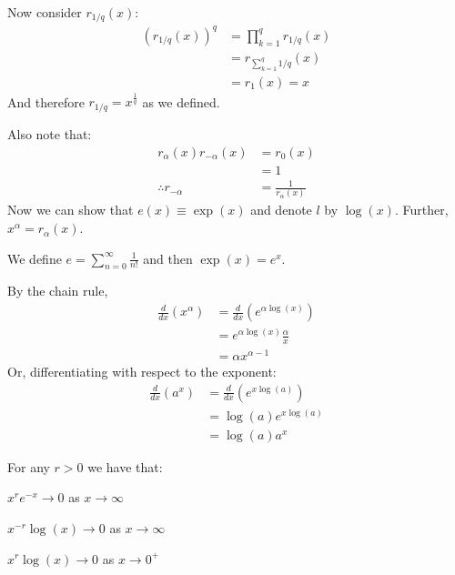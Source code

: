 \documentclass[../Main.tex]{subfiles}
\begin{document}
Now consider $r_{1/q}(x)$:
\begin{align*}
    \left(r_{1/q}(x)\right)^q &= \prod_{k = 1}^q r_{1/q}(x) \\
    &= r_{\sum_{k = 1}^q 1/q}(x) \\
    &= r_1(x) = x
\end{align*}
And therefore $r_{1/q} = x^{\frac{1}{q}}$ as we defined.\par
Also note that:
\begin{align*}
    r_\alpha(x) r_{-\alpha}(x) &= r_0(x) \\
    &=1 \\
    \therefore r_{-\alpha} &= \frac{1}{r_\alpha(x)}
\end{align*}
Now we can show that $e(x) \equiv \exp(x)$ and denote $l$ by $\log(x)$. Further, $x^\alpha = r_\alpha(x)$.\par
We define $e = \sum_{n=0}^\infty \frac{1}{n!}$ and then $\exp(x) = e^x$.\par
By the chain rule,
\begin{align*}
    \frac{d}{dx}(x^\alpha) &= \frac{d}{dx}(e^{\alpha \log(x)}) \\
    &= e^{\alpha \log(x)} \frac{\alpha}{x} \\
    &= \alpha x^{\alpha - 1}
\end{align*}
Or, differentiating with respect to the exponent:
\begin{align*}
    \frac{d}{dx} (a^x) &= \frac{d}{dx}(e^{x \log(a)}) \\
    &= \log(a) e^{x \log(a)} \\
    &= \log(a) a^x
\end{align*}
\begin{propositions}{
        For any $r > 0$ we have that:
        \label{propsExpLimits}
    }
    \item $x^r e^{-x} \to 0$ as $x \to \infty$
    \item $x^{-r} \log(x) \to 0$ as $x \to \infty$
    \item $x^r \log(x) \to 0$ as $x \to 0^+$
\end{propositions}
\end{document}
